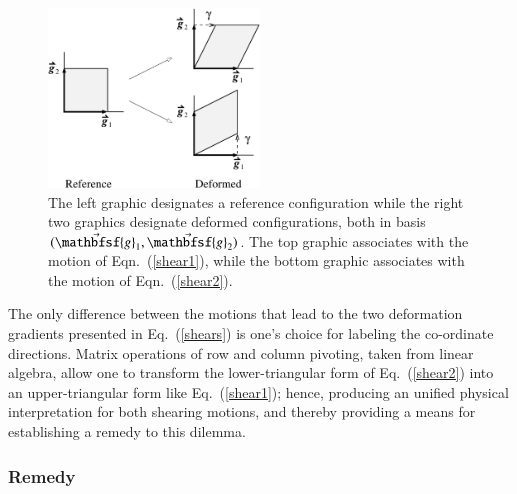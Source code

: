 \begin{figure}
	\centering
	\includegraphics[width=0.5\textwidth]{figures/figDilemma.pdf}
	\caption{The left graphic designates a reference configuration while the right two graphics designate deformed configurations, both in basis $( \vec{\mathbfsf{g}}_1 , \vec{\mathbfsf{g}}_2 )$.  The top graphic associates with the motion of Eqn.~(\ref{shear1}), while the bottom graphic associates with the motion of Eqn.~(\ref{shear2}).}
	\label{figDilemma}
\end{figure}

The only difference between the motions that lead to the two deformation gradients presented in Eq.~(\ref{shears}) is one's choice for labeling the co-ordinate directions.  Matrix operations of row and column pivoting, taken from linear algebra, allow one to transform the lower-triangular form of Eq.~(\ref{shear2}) into an upper-triangular form like Eq.~(\ref{shear1}); hence, producing an unified physical interpretation for both shearing motions, and thereby providing a means for establishing a remedy to this dilemma. 


\subsubsection{Remedy}
\label{secRemedy}

